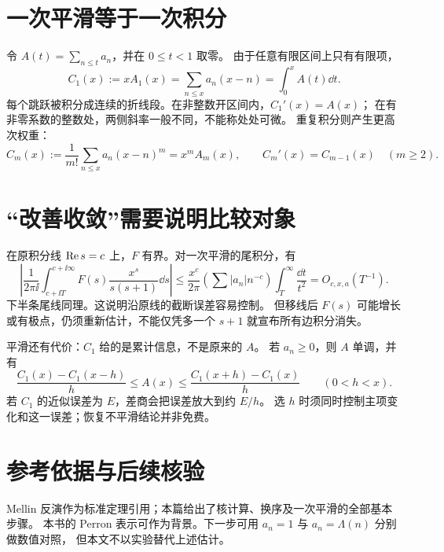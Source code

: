\documentclass[UTF8,fontset=fandol,11pt]{ctexart}
\begin{document}
\section{一次平滑等于一次积分}
令 $A(t)=\sum_{n\le t}a_n$，并在 $0\le t<1$ 取零。
由于任意有限区间上只有有限项，
\[
 C_1(x):=xA_1(x)=\sum_{n\le x}a_n(x-n)
       =\int_0^xA(t)\dd t.
\]
每个跳跃被积分成连续的折线段。在非整数开区间内，$C_1'(x)=A(x)$；
在有非零系数的整数处，两侧斜率一般不同，不能称处处可微。
重复积分则产生更高次权重：
\[
 C_m(x):=\frac1{m!}\sum_{n\le x}a_n(x-n)^m=x^mA_m(x),\qquad
 C_m'(x)=C_{m-1}(x)\quad(m\ge2).
\]

\section{“改善收敛”需要说明比较对象}
在原积分线 $\operatorname{Re} s=c$ 上，$F$ 有界。对一次平滑的尾积分，有
\[
 \left|\frac1{2\pi\ii}\int_{c+\ii T}^{c+\ii\infty}
 F(s)\frac{x^s}{s(s+1)}\dd s\right|
 \le\frac{x^c}{2\pi}
 \left(\sum |a_n|n^{-c}\right)\int_T^\infty\frac{\dd t}{t^2}
 =O_{c,x,a}(T^{-1}).
\]
下半条尾线同理。这说明沿原线的截断误差容易控制。
但移线后 $F(s)$ 可能增长或有极点，仍须重新估计，不能仅凭多一个 $s+1$ 就宣布所有边积分消失。

平滑还有代价：$C_1$ 给的是累计信息，不是原来的 $A$。
若 $a_n\ge0$，则 $A$ 单调，并有
\[
 \frac{C_1(x)-C_1(x-h)}h\le A(x)
 \le\frac{C_1(x+h)-C_1(x)}h\qquad(0<h<x).
\]
若 $C_1$ 的近似误差为 $E$，差商会把误差放大到约 $E/h$。
选 $h$ 时须同时控制主项变化和这一误差；恢复不平滑结论并非免费。

\section*{参考依据与后续核验}
Mellin 反演作为标准定理引用；本篇给出了核计算、换序及一次平滑的全部基本步骤。
本书的 Perron 表示可作为背景。下一步可用 $a_n=1$ 与 $a_n=\Lambda(n)$ 分别做数值对照，
但本文不以实验替代上述估计。
\end{document}

